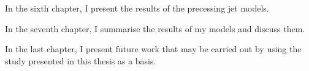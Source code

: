 In the sixth chapter, I present the results of the precessing jet models. 

In the seventh chapter, I summarise the results of my models and discuss them. 

In the last chapter, I present future work that may be carried out by using the study presented in this thesis as a basis. 



  

%

